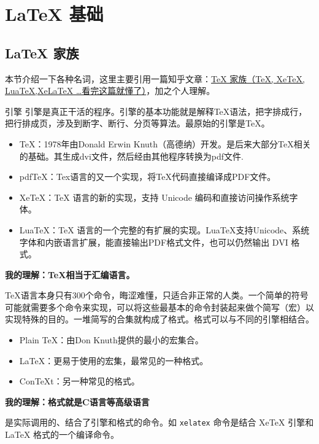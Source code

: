 \chapter{\LaTeX{} 基础}\label{chap:latex}
\section{\LaTeX{} 家族}\label{sec:latexfamily}
本节介绍一下各种名词，这里主要引用一篇知乎文章：\href{https://zhuanlan.zhihu.com/p/248669482}{TeX 家族（TeX, XeTeX, LuaTeX,XeLaTeX …看完这篇就懂了）}，加之个人理解。
\begin{explain*}{引擎}
    引擎是真正干活的程序。引擎的基本功能就是解释TeX语法，把字排成行，把行排成页，涉及到断字、断行、分页等算法。最原始的引擎是TeX。
    \begin{itemize}
        \item TeX：1978年由Donald Erwin Knuth（高德纳）开发。是后来大部分TeX相关的基础。其生成dvi文件，然后经由其他程序转换为pdf文件.
        \item pdfTeX：Tex语言的又一个实现，将TeX代码直接编译成PDF文件。
        \item XeTeX：TeX 语言的新的实现，支持 Unicode 编码和直接访问操作系统字体。
        \item LuaTeX：TeX 语言的一个完整的有扩展的实现。LuaTeX支持Unicode、系统字体和内嵌语言扩展，能直接输出PDF格式文件，也可以仍然输出 DVI 格式。
    \end{itemize}

    \bf{我的理解：TeX相当于汇编语言。}
\end{explain*}

\begin{explain*}[格式]
    TeX语言本身只有300个命令，晦涩难懂，只适合非正常的人类。一个简单的符号可能就需要多个命令来实现，可以将这些最基本的命令封装起来做个简写（宏）以实现特殊的目的。一堆简写的合集就构成了格式。格式可以与不同的引擎相结合。
    \begin{itemize}
        \item Plain TeX：由Don Knuth提供的最小的宏集合。
        \item LaTeX：更易于使用的宏集，最常见的一种格式。
        \item ConTeXt：另一种常见的格式。
    \end{itemize}


    \bf{我的理解：格式就是C语言等高级语言}
\end{explain*}

\begin{explain*}[编译命令]
    是实际调用的、结合了引擎和格式的命令。如 \lstinline{xelatex} 命令是结合  XeTeX 引擎和    LaTeX 格式的一个编译命令。
\end{explain*}

